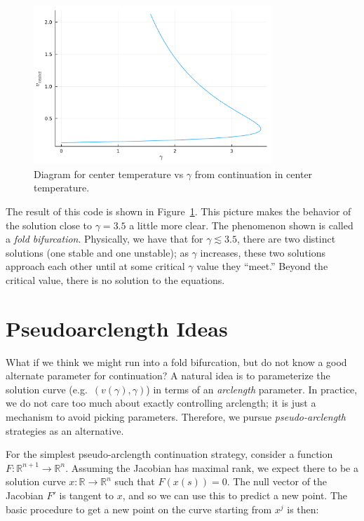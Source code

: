 \documentclass[12pt, leqno]{article} %
\begin{document}
\begin{figure}
\begin{center}
  \includegraphics[width=0.8\textwidth]{fig/2023-04-21-bif1.pdf}
\end{center}
\caption{Diagram for center temperature vs $\gamma$ from continuation in
  center temperature.}
\label{fig:bif1}
\end{figure}

The result of this code is shown in Figure~\ref{fig:bif1}.
This picture makes the behavior of the solution close to 
$\gamma = 3.5$ a little more clear. The phenomenon shown is called a {\em fold
bifurcation}. Physically, we have that for $\gamma \lesssim 3.5$,
there are two distinct solutions (one stable and one unstable); as
$\gamma$ increases, these two solutions approach each other until at
some critical $\gamma$ value they ``meet.'' Beyond the critical value,
there is no solution to the equations.

\section{Pseudoarclength Ideas}

What if we think we might run into a fold bifurcation, but do not know a
good alternate parameter for continuation? A natural idea is to
parameterize the solution curve (e.g.~\((v(\gamma),\gamma)\)) in terms
of an \emph{arclength} parameter. In practice, we do not care too much
about exactly controlling arclength; it is just a mechanism to avoid
picking parameters. Therefore, we pursue \emph{pseudo-arclength}
strategies as an alternative.

For the simplest pseudo-arclength continuation strategy, consider a
function \(F : {\mathbb{R}}^{n+1} \rightarrow {\mathbb{R}}^n\). Assuming
the Jacobian has maximal rank, we expect there to be a solution curve
\(x : {\mathbb{R}}\rightarrow {\mathbb{R}}^n\) such that
\(F(x(s)) = 0\). The null vector of the Jacobian \(F'\) is tangent to
\(x\), and so we can use this to predict a new point. The basic
procedure to get a new point on the curve starting from \(x^j\) is then:
\end{document}
